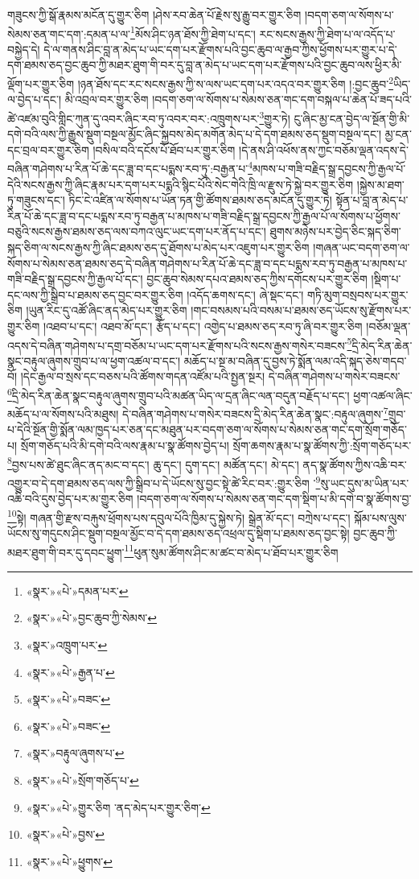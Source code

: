 གཟུངས་ཀྱི་སྒོ་རྣམས་མངོན་དུ་གྱུར་ཅིག །ཤེས་རབ་ཆེན་པོ་རྗེས་སུ་རྒྱུ་བར་གྱུར་ཅིག །བདག་ཅག་ལ་སོགས་པ་སེམས་ཅན་གང་དག་:དམན་པ་ལ་\footnote{«སྣར་»«པེ་»དམན་པར་}མོས་ཤིང་ཉན་ཐོས་ཀྱི་ཐེག་པ་དང་། རང་སངས་རྒྱས་ཀྱི་ཐེག་པ་ལ་འདོད་པ་བསྐྱེད་དེ། དེ་ལ་གནས་ཤིང་བླ་ན་མེད་པ་ཡང་དག་པར་རྫོགས་པའི་བྱང་ཆུབ་ལ་རྒྱབ་ཀྱིས་ཕྱོགས་པར་གྱུར་པ་དེ་དག་ཐམས་ཅད་བྱང་ཆུབ་ཀྱི་མཐར་ཐུག་གི་བར་དུ་བླ་ན་མེད་པ་ཡང་དག་པར་རྫོགས་པའི་བྱང་ཆུབ་ལས་ཕྱིར་མི་ལྡོག་པར་གྱུར་ཅིག །ཉན་ཐོས་དང་རང་སངས་རྒྱས་ཀྱི་ས་ལས་ཡང་དག་པར་འདའ་བར་གྱུར་ཅིག །:བྱང་ཆུབ་\footnote{«སྣར་»«པེ་»བྱང་ཆུབ་ཀྱི་སེམས་}ཡིད་ལ་བྱེད་པ་དང་། མི་འབྲལ་བར་གྱུར་ཅིག །བདག་ཅག་ལ་སོགས་པ་སེམས་ཅན་གང་དག་བསྐལ་པ་ཆེན་པོ་ཟད་པའི་ཚེ་འཛམ་བུའི་གླིང་ཀུན་དུ་འབར་ཞིང་རབ་ཏུ་འབར་བར་:འཁྲུགས་པར་\footnote{«སྣར་»འཁྲུག་པར་}གྱུར་ཏེ། ངུ་ཞིང་མྱ་ངན་བྱེད་ལ་སྔོན་གྱི་མི་དགེ་བའི་ལས་ཀྱི་རྒྱུས་སྡུག་བསྔལ་མྱོང་ཞིང་སྐྱབས་མེད་མགོན་མེད་པ་དེ་དག་ཐམས་ཅད་སྡུག་བསྔལ་དང་། མྱ་ངན་དང་བྲལ་བར་གྱུར་ཅིག །བསིལ་བའི་དངོས་པོ་ཐོབ་པར་གྱུར་ཅིག །དེ་ནས་ཤི་འཕོས་ནས་ཀྱང་བཅོམ་ལྡན་འདས་དེ་བཞིན་གཤེགས་པ་རིན་པོ་ཆེ་དང་ཟླ་བ་དང་པདྨས་རབ་ཏུ་:བརྒྱན་པ་\footnote{«སྣར་»«པེ་»རྒྱན་པ་}མཁས་པ་གཟི་བརྗིད་སྒྲ་དབྱངས་ཀྱི་རྒྱལ་པོ་དེའི་སངས་རྒྱས་ཀྱི་ཞིང་རྣམ་པར་དག་པར་པདྨའི་སྙིང་པོའི་སེང་གེའི་ཁྲི་ལ་རྫུས་ཏེ་སྐྱེ་བར་གྱུར་ཅིག །སྐྱེས་མ་ཐག་ཏུ་གཟུངས་དང་། ཏིང་ངེ་འཛིན་ལ་སོགས་པ་ཡོན་ཏན་གྱི་ཚོགས་ཐམས་ཅད་མངོན་དུ་གྱུར་ཏེ། སྟོན་པ་བླ་ན་མེད་པ་རིན་པོ་ཆེ་དང་ཟླ་བ་དང་པདྨས་རབ་ཏུ་བརྒྱན་པ་མཁས་པ་གཟི་བརྗིད་སྒྲ་དབྱངས་ཀྱི་རྒྱལ་པོ་ལ་སོགས་པ་ཕྱོགས་བཅུའི་སངས་རྒྱས་ཐམས་ཅད་ལས་བཀའ་ལུང་ཡང་དག་པར་ནོད་པ་དང་། ཐུགས་མཉེས་པར་བྱེད་ཅིང་སྐད་ཅིག་སྐད་ཅིག་ལ་སངས་རྒྱས་ཀྱི་ཞིང་ཐམས་ཅད་དུ་ཐོགས་པ་མེད་པར་འཇུག་པར་གྱུར་ཅིག །གཞན་ཡང་བདག་ཅག་ལ་སོགས་པ་སེམས་ཅན་ཐམས་ཅད་དེ་བཞིན་གཤེགས་པ་རིན་པོ་ཆེ་དང་ཟླ་བ་དང་པདྨས་རབ་ཏུ་བརྒྱན་པ་མཁས་པ་གཟི་བརྗིད་སྒྲ་དབྱངས་ཀྱི་རྒྱལ་པོ་དང་། བྱང་ཆུབ་སེམས་དཔའ་ཐམས་ཅད་ཀྱིས་དགོངས་པར་གྱུར་ཅིག །སྡིག་པ་དང་ལས་ཀྱི་སྒྲིབ་པ་ཐམས་ཅད་བྱང་བར་གྱུར་ཅིག །འདོད་ཆགས་དང་། ཞེ་སྡང་དང་། གཏི་མུག་བསྲབས་པར་གྱུར་ཅིག །ཡུན་རིང་དུ་འཚོ་ཞིང་ནད་མེད་པར་གྱུར་ཅིག །གང་བསམས་པའི་བསམ་པ་ཐམས་ཅད་ཡོངས་སུ་རྫོགས་པར་གྱུར་ཅིག །འཐབ་པ་དང་། འཐབ་མོ་དང་། རྩོད་པ་དང་། འགྱེད་པ་ཐམས་ཅད་རབ་ཏུ་ཞི་བར་གྱུར་ཅིག །བཅོམ་ལྡན་འདས་དེ་བཞིན་གཤེགས་པ་དགྲ་བཅོམ་པ་ཡང་དག་པར་རྫོགས་པའི་སངས་རྒྱས་གསེར་བཟངས་\footnote{«སྣར་»«པེ་»བཟང་}དྲི་མེད་རིན་ཆེན་སྣང་བརྟུལ་ཞུགས་གྲུབ་པ་ལ་ཕྱག་འཚལ་བ་དང་། མཆོད་པ་སྔ་མ་བཞིན་དུ་བྱས་ཏེ་སྨོན་ལམ་འདི་སྐད་ཅེས་གདབ་བོ། །དེང་རྒྱལ་བ་སྲས་དང་བཅས་པའི་ཚོགས་གདན་འཛོམ་པའི་སྤྱན་སྔར། དེ་བཞིན་གཤེགས་པ་གསེར་བཟངས་\footnote{«སྣར་»«པེ་»བཟང་}དྲི་མེད་རིན་ཆེན་སྣང་བརྟུལ་ཞུགས་གྲུབ་པའི་མཚན་ཡིད་ལ་དྲན་ཞིང་ལན་བདུན་བརྗོད་པ་དང་། ཕྱག་འཚལ་ཞིང་མཆོད་པ་ལ་སོགས་པའི་མཐུས། དེ་བཞིན་གཤེགས་པ་གསེར་བཟངས་དྲི་མེད་རིན་ཆེན་སྣང་:བརྟུལ་ཞུགས་\footnote{«སྣར་»བརྟུལ་ཞུགས་པ་}གྲུབ་པ་དེའི་སྔོན་གྱི་སྨོན་ལམ་ཁྱད་པར་ཅན་དང་མཐུན་པར་བདག་ཅག་ལ་སོགས་པ་སེམས་ཅན་གང་དག་སྲོག་གཅོད་པ། སྲོག་གཅོད་པའི་མི་དགེ་བའི་ལས་རྣམ་པ་སྣ་ཚོགས་བྱེད་པ། སྲོག་ཆགས་རྣམ་པ་སྣ་ཚོགས་ཀྱི་:སྲོག་གཅོད་པར་\footnote{«སྣར་»«པེ་»སྲོག་གཅོད་པ་}བྱས་པས་ཚེ་ཐུང་ཞིང་ནད་མང་བ་དང་། ཆུ་དང་། དུག་དང་། མཚོན་དང་། མེ་དང་། ནད་སྣ་ཚོགས་ཀྱིས་འཆི་བར་འགྱུར་བ་དེ་དག་ཐམས་ཅད་ལས་ཀྱི་སྒྲིབ་པ་དེ་ཡོངས་སུ་བྱང་སྟེ་ཚེ་རིང་བར་:གྱུར་ཅིག ་\footnote{«སྣར་»«པེ་»གྱུར་ཅིག ་ནད་མེད་པར་གྱུར་ཅིག་}སུ་ཡང་དུས་མ་ཡིན་པར་འཆི་བའི་དུས་བྱེད་པར་མ་གྱུར་ཅིག །བདག་ཅག་ལ་སོགས་པ་སེམས་ཅན་གང་དག་སྡིག་པ་མི་དགེ་བ་སྣ་ཚོགས་བྱ་\footnote{«སྣར་»«པེ་»བྱས་}སྟེ། གཞན་གྱི་རྫས་བརྐུས་ཕྲོགས་པས་དབུལ་པོའི་ཁྱིམ་དུ་སྐྱེས་ཏེ། སྒྲེན་མོ་དང་། བཀྲེས་པ་དང་། སྐོམ་པས་ལུས་ཡོངས་སུ་གདུངས་ཤིང་སྡུག་བསྔལ་མྱོང་བ་དེ་དག་ཐམས་ཅད་འཕྲལ་དུ་སྡིག་པ་ཐམས་ཅད་བྱང་སྟེ། བྱང་ཆུབ་ཀྱི་མཐར་ཐུག་གི་བར་དུ་དབང་ཕྱུག་\footnote{«སྣར་»«པེ་»ཕྱུགས་}ཕུན་སུམ་ཚོགས་ཤིང་མ་ཚང་བ་མེད་པ་ཐོབ་པར་གྱུར་ཅིག 